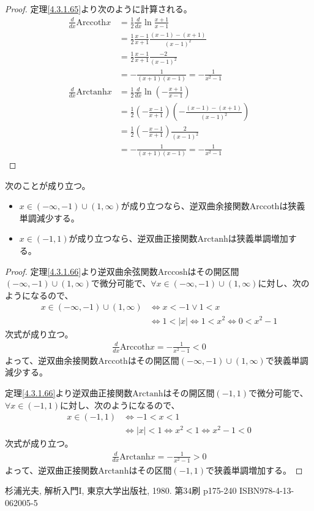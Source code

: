 \documentclass[dvipdfmx]{jsarticle}
\begin{document}
\begin{proof} 定理\ref{4.3.1.65}より次のように計算される。
\begin{align*}
\frac{d}{dx}{\mathrm{Arccoth}}x &= \frac{1}{2}\frac{d}{dx}\ln\frac{x + 1}{x - 1}\\
&= \frac{1}{2}\frac{x - 1}{x + 1}\frac{(x - 1) - (x + 1)}{(x - 1)^{2}}\\
&= \frac{1}{2}\frac{x - 1}{x + 1}\frac{- 2}{(x - 1)^{2}}\\
&= - \frac{1}{(x + 1)(x - 1)} = - \frac{1}{x^{2} - 1}\\
\frac{d}{dx}{\mathrm{Arctanh}}x &= \frac{1}{2}\frac{d}{dx}\ln\left( - \frac{x + 1}{x - 1} \right)\\
&= \frac{1}{2}\left( - \frac{x - 1}{x + 1} \right)\left( - \frac{(x - 1) - (x + 1)}{(x - 1)^{2}} \right)\\
&= \frac{1}{2}\left( - \frac{x - 1}{x + 1} \right)\frac{2}{(x - 1)^{2}}\\
&= - \frac{1}{(x + 1)(x - 1)} = - \frac{1}{x^{2} - 1}
\end{align*}
\end{proof}
\begin{thm}\label{4.3.1.67} 次のことが成り立つ。
\begin{itemize}
\item
  $x \in ( - \infty, - 1) \cup (1,\infty)$が成り立つなら、逆双曲余接関数$\mathrm{Arccoth}$は狭義単調減少する。
\item
  $x \in ( - 1,1)$が成り立つなら、逆双曲正接関数$\mathrm{Arctanh}$は狭義単調増加する。
\end{itemize}
\end{thm}
\begin{proof} 定理\ref{4.3.1.66}より逆双曲余弦関数$\mathrm{Arccosh}$はその開区間$( - \infty, - 1) \cup (1,\infty)$で微分可能で、$\forall x \in ( - \infty, - 1) \cup (1,\infty)$に対し、次のようになるので、
\begin{align*}
x \in ( - \infty, - 1) \cup (1,\infty) &\Leftrightarrow x < - 1 \vee 1 < x\\
&\Leftrightarrow 1 < |x| \Leftrightarrow 1 < x^{2} \Leftrightarrow 0 < x^{2} - 1
\end{align*}
次式が成り立つ。
\begin{align*}
\frac{d}{dx}{\mathrm{Arccoth}}x = - \frac{1}{x^{2} - 1} < 0
\end{align*}
よって、逆双曲余接関数$\mathrm{Arccoth}$はその開区間$( - \infty, - 1) \cup (1,\infty)$で狭義単調減少する。\par
定理\ref{4.3.1.66}より逆双曲正接関数$\mathrm{Arctanh}$はその開区間$( - 1,1)$で微分可能で、$\forall x \in ( - 1,1)$に対し、次のようになるので、
\begin{align*}
x \in ( - 1,1) &\Leftrightarrow - 1 < x < 1\\
&\Leftrightarrow |x| < 1 \Leftrightarrow x^{2} < 1 \Leftrightarrow x^{2} - 1 < 0
\end{align*}
次式が成り立つ。
\begin{align*}
\frac{d}{dx}{\mathrm{Arctanh}}x = - \frac{1}{x^{2} - 1} > 0
\end{align*}
よって、逆双曲正接関数$\mathrm{Arctanh}$はその区間$( - 1,1)$で狭義単調増加する。
\end{proof}
\begin{thebibliography}{50}
  杉浦光夫, 解析入門I, 東京大学出版社, 1980. 第34刷 p175-240 ISBN978-4-13-062005-5
\end{thebibliography}
\end{document}
